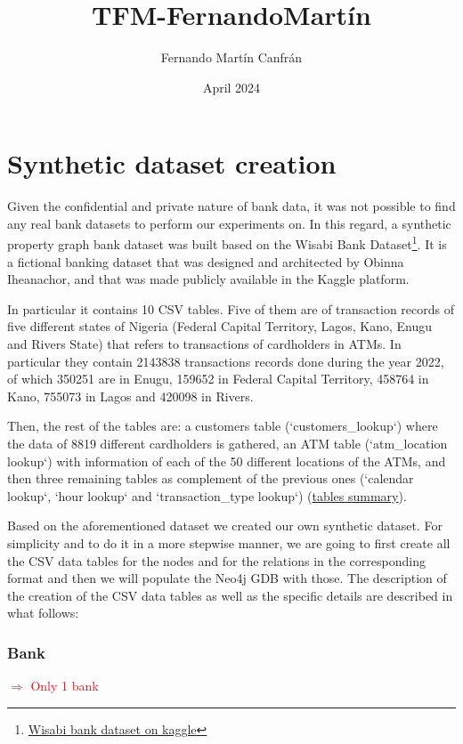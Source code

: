 \documentclass{article}
\title{TFM-FernandoMartín}
\author{Fernando Martín Canfrán}
\date{April 2024}
\begin{document}
\section{Synthetic dataset creation}

Given the confidential and private nature of bank data, it was not possible to find
any real bank datasets to perform our experiments on. In this regard, a synthetic property
graph bank dataset was built based on the Wisabi Bank Dataset\footnote{\href{https://www.kaggle.com/datasets/obinnaiheanachor/wisabi-bank-dataset}{Wisabi bank dataset on kaggle}}. It is a fictional banking dataset that 
was designed and architected by Obinna Iheanachor, and that was made publicly available in
the Kaggle platform.
 

In particular it contains 10 CSV tables. Five of them are of transaction records of five 
different states of Nigeria (Federal Capital Territory, Lagos, Kano, Enugu and Rivers State) 
that refers to transactions of cardholders in ATMs. In particular they contain 2143838 
transactions records done during the year 2022, of which 350251 are in Enugu, 159652 in 
Federal Capital Territory, 458764 in Kano, 755073 in Lagos and 420098 in Rivers.

Then, the rest of the tables are: a customers table (`customers\_lookup`) where the data
of 8819 different cardholders is gathered, an ATM table (`atm\_location lookup`) with
information of each of the 50 different locations of the ATMs, and then three remaining
tables as complement of the previous ones (`calendar lookup`, `hour lookup` and 
`transaction\_type lookup`) 
(\href{https://app.diagrams.net/#G1eAn47YR7-zPNE5KgStkA6_IJcxZRYgX8#%7B%22pageId%22%3A%22R2lEEEUBdFMjLlhIrx00%22%7D}{tables summary}).

Based on the aforementioned dataset we created our own synthetic dataset. For simplicity 
and to do it in a more stepwise manner, we are going to first create all the CSV data tables
for the nodes and for the relations in the corresponding format and then we will populate 
the Neo4j GDB with those.
The description of the creation of the CSV data tables as well as the specific details are 
described in what follows:

\subsubsection*{Bank}

\begin{tcolorbox}
\textcolor{red}{$\Rightarrow$ Only 1 bank}
\end{tcolorbox}
\end{document}
